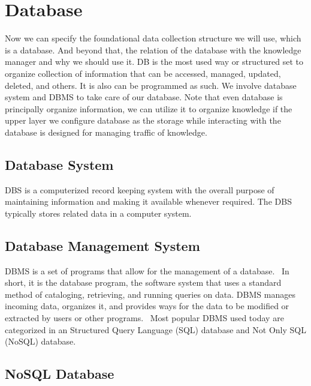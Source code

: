 \section{Database}
\label{sec:database}

Now we can specify the foundational data collection structure we will use, which is a database. And beyond that, the relation of the database with the knowledge manager and why we should use it.
\ac{DB} is the most used way or structured set to organize collection of information that can be accessed, managed, updated, deleted, and others.
It is also can be programmed as such.
We involve database system and \ac{DBMS} to take care of our database.
Note that even database is principally organize information, we can utilize it to organize knowledge if the upper layer we configure database as the storage while interacting with the database is designed for managing traffic of knowledge.

\subsection{Database System}

\ac{DBS} is a computerized record keeping system with the overall purpose of maintaining information and making it available whenever required.
The \ac{DBS} typically stores related data in a computer system.~\autocite{Foster2014Intro}

\subsection{Database Management System}

\ac{DBMS} is a set of programs that allow for the
management of a database.~\autocite{Foster2014Intro}
In short, it is the database program, the software system that uses a standard method of cataloging, retrieving, and running queries on data. \ac{DBMS} manages incoming data, organizes it, and provides ways for the data to be modified or extracted by users or other programs.~\autocite{TechTerms:2014:DBMS}
Most popular \ac{DBMS} used today are categorized in an Structured Query Language (\ac{SQL}) database and Not Only SQL (\ac{NoSQL}) database.

\subsection{NoSQL Database}

